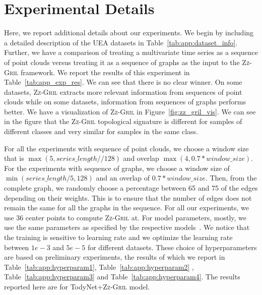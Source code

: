 \documentclass{article}
\newcommand{\zzgril}{\textsc{Zz-Gril}}
\theoremstyle{plain}
\theoremstyle{definition}
\theoremstyle{remark}
\begin{document}
    




\section{Experimental Details}

\label{app:exp}
Here, we report additional details about our experiments. We begin by including a detailed description of the UEA datasets in Table~\ref{tab:app:dataset_info}. Further, we have a comparison of treating a multivariate time series as a sequence of point clouds versus treating it as a sequence of graphs as the input to the \zzgril{} framework. We report the results of this experiment in Table~\ref{tab:app_exp_res}. We can see that there is no clear winner. On some datasets, \zzgril{} extracts more relevant information from sequences of point clouds while on some datasets, information from sequences of graphs performs better. We have a visualization of \zzgril{} in Figure~\ref{fig:zz_gril_vis}. We can see in the figure that the \zzgril{} topological signature is different for samples of different classes and very similar for samples in the same class.


For all the experiments with sequence of point clouds, we choose a window size that is $\max(5, series\_length//128)$ and overlap $\max(4, 0.7*window\_size)$. For the experiments with sequence of graphs, we choose a window size of $\min(series\_length/5,128)$ and an overlap of $0.7*window\_size$. Then, from the complete graph, we randomly choose a percentage between 65 and 75 of the edges depending on their weights. This is to ensure that the number of edges does not remain the same for all the graphs in the sequence. For all our experiments, we use 36 center points to compute \zzgril{} at. For model parameters, mostly, we use the same parameters as specified by the respective models~\cite{todynet, stdpgcn}. We notice that the training is sensitive to learning rate and we optimize the learning rate between $1e-3$ and $5e-5$ for different datasets. These choice of hyperparameters are based on preliminary experiments, the results of which we report in Table~\ref{tab:app:hyperparam1}, Table~\ref{tab:app:hyperparam2} , Table~\ref{tab:app:hyperparam3} and Table~\ref{tab:app:hyperparam4}. The results reported here are for TodyNet+\zzgril{} model.
\end{document}
